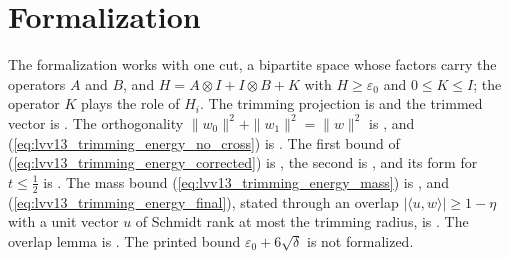 \documentclass{article}
\begin{document}
\section{Formalization}

The formalization works with one cut, a bipartite space whose factors
carry the operators $A$ and $B$, and $H=A\otimes I+I\otimes B+K$ with
$H\ge\varepsilon_0$ and $0\le K\le I$; the operator $K$ plays the role of
$H_i$. The trimming projection is
 and the trimmed vector is
. The orthogonality $\|w_0\|^2+\|w_1\|^2=\|w\|^2$
is , and
(\ref{eq:lvv13_trimming_energy_no_cross}) is
. The first
bound of (\ref{eq:lvv13_trimming_energy_corrected}) is
, the second is
, and its form for
$t\le\frac12$ is
. The
mass bound (\ref{eq:lvv13_trimming_energy_mass}) is
, and
(\ref{eq:lvv13_trimming_energy_final}), stated through an overlap
$|\langle u,w\rangle|\ge1-\eta$ with a unit vector $u$ of Schmidt rank at
most the trimming radius, is
.
The overlap lemma is . The printed
bound $\varepsilon_0+6\sqrt\delta$ is not formalized.



\end{document}
